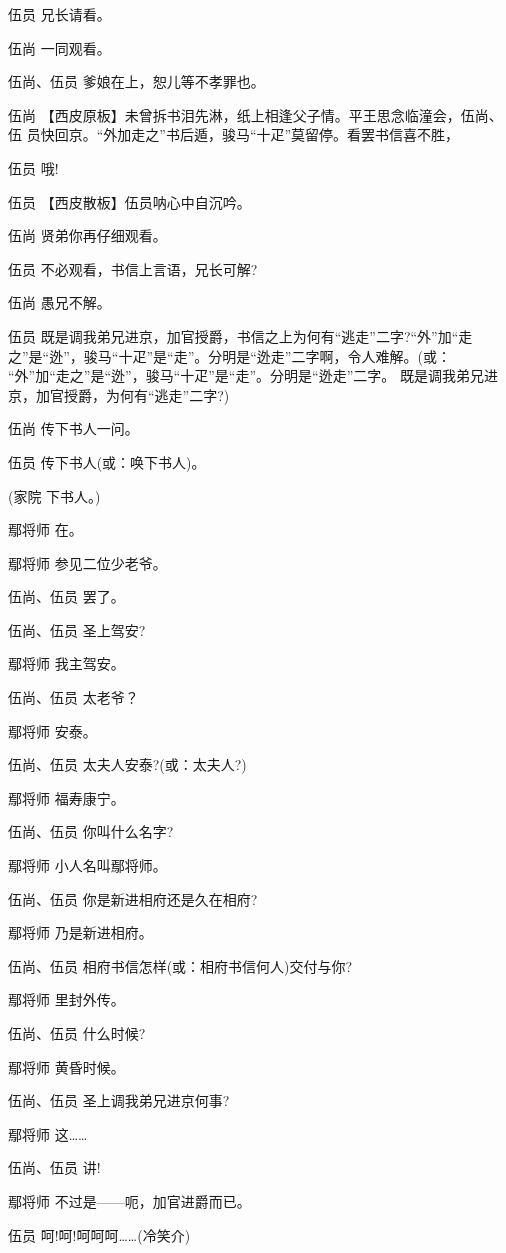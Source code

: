 伍员 兄长请看。

伍尚 一同观看。

伍尚、伍员 爹娘在上，恕儿等不孝罪也。

伍尚
【西皮原板】未曾拆书泪先淋，纸上相逢父子情。平王思念临潼会，伍尚、伍
员快回京。``外加走之''书后遁，骏马``十疋''莫留停。看罢书信喜不胜，

伍员 哦!

伍员 【西皮散板】伍员呐心中自沉吟。

伍尚 贤弟你再仔细观看。

伍员 不必观看，书信上言语，兄长可解?

伍尚 愚兄不解。

伍员 既是调我弟兄进京，加官授爵，书信之上为何有``逃走''二字?``外''加``走
之''是``迯''，骏马``十疋''是``走''。分明是``迯走''二字啊，令人难解。(或：
``外''加``走之''是``迯''，骏马``十疋''是``走''。分明是``迯走''二字。
既是调我弟兄进京，加官授爵，为何有``逃走''二字?)

伍尚 传下书人一问。

伍员 传下书人(或：唤下书人)。

(家院 下书人。)

鄢将师 在。

鄢将师 参见二位少老爷。

伍尚、伍员 罢了。

伍尚、伍员 圣上驾安?

鄢将师 我主驾安。

伍尚、伍员 太老爷？

鄢将师 安泰。

伍尚、伍员 太夫人安泰?(或：太夫人?)

鄢将师 福寿康宁。

伍尚、伍员 你叫什么名字?

鄢将师 小人名叫鄢将师。

伍尚、伍员 你是新进相府还是久在相府?

鄢将师 乃是新进相府。

伍尚、伍员 相府书信怎样(或：相府书信何人)交付与你?

鄢将师 里封外传。

伍尚、伍员 什么时候?

鄢将师 黄昏时候。

伍尚、伍员 圣上调我弟兄进京何事?

鄢将师 这\ldots{}\ldots{}

伍尚、伍员 讲!

鄢将师 不过是------呃，加官进爵而已。

伍员 呵!呵!呵呵呵\ldots{}\ldots{}(冷笑介)


